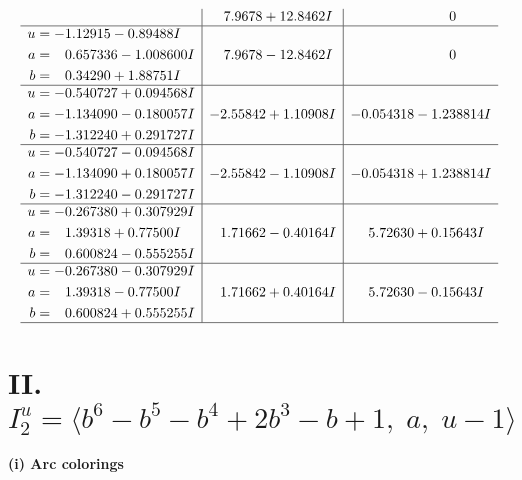 \documentclass[1p]{elsarticle_modified}
\theoremstyle{definition}
\begin{document}
$$\begin{array}{c|c|c}
 & \phantom{-}7.9678 + 12.8462 I & \phantom{-0.000000 } 0 \\ \hline\begin{aligned}
u &= -1.12915 - 0.89488 I \\
a &= \phantom{-}0.657336 - 1.008600 I \\
b &= \phantom{-}0.34290 + 1.88751 I\end{aligned}
 & \phantom{-}7.9678 - 12.8462 I & \phantom{-0.000000 } 0 \\ \hline\begin{aligned}
u &= -0.540727 + 0.094568 I \\
a &= -1.134090 - 0.180057 I \\
b &= -1.312240 + 0.291727 I\end{aligned}
 & -2.55842 + 1.10908 I & -0.054318 - 1.238814 I \\ \hline\begin{aligned}
u &= -0.540727 - 0.094568 I \\
a &= -1.134090 + 0.180057 I \\
b &= -1.312240 - 0.291727 I\end{aligned}
 & -2.55842 - 1.10908 I & -0.054318 + 1.238814 I \\ \hline\begin{aligned}
u &= -0.267380 + 0.307929 I \\
a &= \phantom{-}1.39318 + 0.77500 I \\
b &= \phantom{-}0.600824 - 0.555255 I\end{aligned}
 & \phantom{-}1.71662 - 0.40164 I & \phantom{-}5.72630 + 0.15643 I \\ \hline\begin{aligned}
u &= -0.267380 - 0.307929 I \\
a &= \phantom{-}1.39318 - 0.77500 I \\
b &= \phantom{-}0.600824 + 0.555255 I\end{aligned}
 & \phantom{-}1.71662 + 0.40164 I & \phantom{-}5.72630 - 0.15643 I\\
 \hline 
 \end{array}$$\newpage\newpage\renewcommand{\arraystretch}{1}
\centering \section*{II. $I^u_{2}= \langle b^6- b^5- b^4+2 b^3- b+1,\;a,\;u-1 \rangle$}
\flushleft \textbf{(i) Arc colorings}\\
\end{document}
